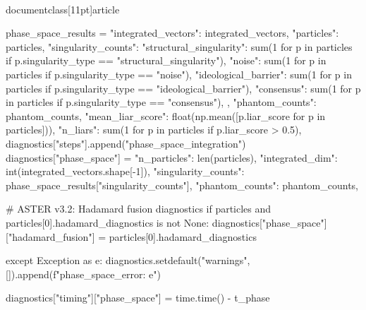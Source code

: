 \\documentclass[11pt]{article}
\begin{document}
\begin{CodeBlock}
                        phase_space_results = {
                            "integrated_vectors": integrated_vectors,
                            "particles": particles,
                            "singularity_counts": {
                                "structural_singularity": sum(1 for p in particles if p.singularity_type == "structural_singularity"),
                                "noise": sum(1 for p in particles if p.singularity_type == "noise"),
                                "ideological_barrier": sum(1 for p in particles if p.singularity_type == "ideological_barrier"),
                                "consensus": sum(1 for p in particles if p.singularity_type == "consensus"),
                            },
                            "phantom_counts": phantom_counts,
                            "mean_liar_score": float(np.mean([p.liar_score for p in particles])),
                            "n_liars": sum(1 for p in particles if p.liar_score > 0.5),
                        }
                        diagnostics["steps"].append("phase_space_integration")
                        diagnostics["phase_space"] = {
                            "n_particles": len(particles),
                            "integrated_dim": int(integrated_vectors.shape[-1]),
                            "singularity_counts": phase_space_results["singularity_counts"],
                            "phantom_counts": phantom_counts,
                        }

                        # ASTER v3.2: Hadamard fusion diagnostics
                        if particles and particles[0].hadamard_diagnostics is not None:
                            diagnostics["phase_space"]["hadamard_fusion"] = particles[0].hadamard_diagnostics

            except Exception as e:
                diagnostics.setdefault("warnings", []).append(f"phase_space_error: {e}")

            diagnostics["timing"]["phase_space"] = time.time() - t_phase


\end{CodeBlock}
\end{document}
